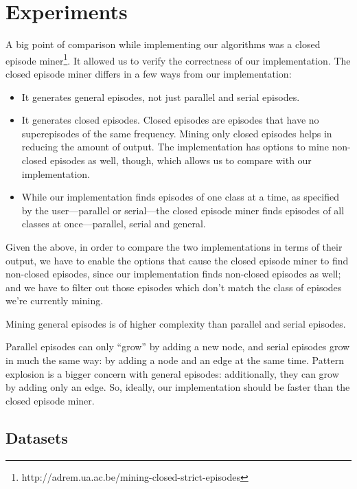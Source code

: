 \chapter{Experiments}
\label{sec:experiments}

A big point of comparison while implementing our algorithms was a closed episode miner\footnote{http://adrem.ua.ac.be/mining-closed-strict-episodes}. It allowed us to verify the correctness of our implementation. The closed episode miner differs in a few ways from our implementation:

\begin{itemize}
\item It generates general episodes, not just parallel and serial episodes.
\item It generates closed episodes. Closed episodes are episodes that have no superepisodes of the same frequency. Mining only closed episodes helps in reducing the amount of output. The implementation has options to mine non-closed episodes as well, though, which allows us to compare with our implementation.
\item While our implementation finds episodes of one class at a time, as specified by the user---parallel or serial---the closed episode miner finds episodes of all classes at once---parallel, serial and general.
\end{itemize}

Given the above, in order to compare the two implementations in terms of their output, we have to enable the options that cause the closed episode miner to find non-closed episodes, since our implementation finds non-closed episodes as well; and we have to filter out those episodes which don't match the class of episodes we're currently mining.

Mining general episodes is of higher complexity than parallel and serial episodes.

Parallel episodes can only ``grow'' by adding a new node, and serial episodes grow in much the same way: by adding a node and an edge at the same time. Pattern explosion is a bigger concern with general episodes: additionally, they can grow by adding only an edge. So, ideally, our implementation should be faster than the closed episode miner.


\section{Datasets}

